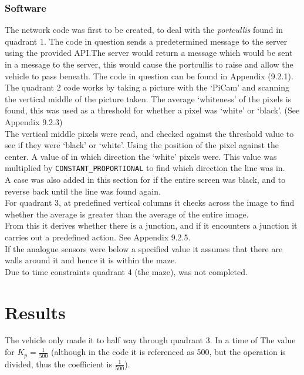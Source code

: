 \documentclass[paper=a4, fontsize=11pt]{scrartcl} %
\numberwithin{equation}{section} %
\numberwithin{figure}{section} %
\begin{document}
\subsubsection{Software}
The network code was first to be created, to deal with the \textit{portcullis}
found in quadrant 1. The code in question sends a predetermined message to the
server using the provided API.\@ The server would return a message which would be
sent in a message to the server, this would cause the portcullis to raise and
allow the vehicle to pass beneath. The code in question can be found in Appendix
(9.2.1).\\

The quadrant 2 code works by taking a picture with the `PiCam' and scanning the
vertical middle of the picture taken. The average `whiteness' of the pixels is
found, this was used as a threshold for whether a pixel was `white' or
`black'. (See Appendix 9.2.3)\\

The vertical middle pixels were read, and checked against the threshold value to
see if they were `black' or `white'. Using the position of the pixel against the
center. A value of in which direction the `white' pixels were. This value was
multiplied by \verb|CONSTANT_PROPORTIONAL| to find which direction the line was
in.\\

A case was also added in this section for if the entire screen was black, and to
reverse back until the line was found again.\\

For quadrant 3, at predefined vertical columns it checks across the image to
find whether the average is greater than the average of the entire image.\\
From this it derives whether there is a junction, and if it encounters a
junction it carries out a predefined action. See Appendix 9.2.5.\\

If the analogue sensors were below a specified value it assumes that there are
walls around it and hence it is within the maze.\\

Due to time constraints quadrant 4 (the maze), was not completed.\\

\section{Results}
The vehicle only made it to half way through quadrant 3. In a time of %
The value for $K_p=\frac{1}{500}$ (although in the code it is referenced as 500,
but the operation is divided, thus the coefficient is $\frac{1}{500}$).
\end{document}
